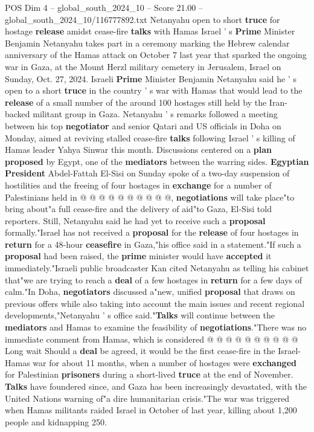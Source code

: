 \begin{textsample}{POS Dim 4 – global\_south\_2024\_10 – Score 21.00 – global\_south\_2024\_10/116777892.txt}  \label{ex:f4_pos_381}
Netanyahu open to short \textbf{truce} for hostage \textbf{release} amidst cease-fire \textbf{talks} with Hamas Israel ' s \textbf{Prime} Minister Benjamin Netanyahu takes part in a ceremony marking the Hebrew calendar anniversary of the Hamas attack on October 7 last year that sparked the ongoing war in Gaza, at the Mount Herzl military cemetery in Jerusalem, Israel on Sunday, Oct. 27, 2024.
Israeli \textbf{Prime} Minister Benjamin Netanyahu said he ' s open to a short \textbf{truce} in the country ' s war with Hamas that would lead to the \textbf{release} of a small number of the around 100 hostages still held by the Iran-backed militant group in Gaza.
Netanyahu ' s remarks followed a meeting between his top \textbf{negotiator} and senior Qatari and US officials in Doha on Monday, aimed at reviving stalled cease-fire \textbf{talks} following Israel ' s killing of Hamas leader Yahya Sinwar this month.
Discussions centered on a \textbf{plan} \textbf{proposed} by Egypt, one of the \textbf{mediators} between the warring sides. \textbf{Egyptian} \textbf{President} Abdel-Fattah El-Sisi on Sunday spoke of a two-day suspension of hostilities and the freeing of four hostages in \textbf{exchange} for a number of Palestinians held in @ @ @ @ @ @ @ @ @ @, \textbf{negotiations} will take place"to bring about"a full cease-fire and the delivery of aid"to Gaza, El-Sisi told reporters.
Still, Netanyahu said he had yet to receive such a \textbf{proposal} formally."Israel has not received a \textbf{proposal} for the \textbf{release} of four hostages in \textbf{return} for a 48-hour \textbf{ceasefire} in Gaza,"his office said in a statement."If such a \textbf{proposal} had been raised, the \textbf{prime} minister would have \textbf{accepted} it immediately."Israeli public broadcaster Kan cited Netanyahu as telling his cabinet that"we are trying to reach a \textbf{deal} of a few hostages in \textbf{return} for a few days of calm."In Doha, \textbf{negotiators} discussed a"new, unified \textbf{proposal} that draws on previous offers while also taking into account the main issues and recent regional developments,"Netanyahu ' s office said."\textbf{Talks} will continue between the \textbf{mediators} and Hamas to examine the feasibility of \textbf{negotiations}."There was no immediate comment from Hamas, which is considered @ @ @ @ @ @ @ @ @ @ Long wait Should a \textbf{deal} be agreed, it would be the first cease-fire in the Israel-Hamas war for about 11 months, when a number of hostages were \textbf{exchanged} for Palestinian \textbf{prisoners} during a short-lived \textbf{truce} at the end of November. \textbf{Talks} have foundered since, and Gaza has been increasingly devastated, with the United Nations warning of"a dire humanitarian crisis."The war was triggered when Hamas militants raided Israel in October of last year, killing about 1,200 people and kidnapping 250.

\end{textsample}

